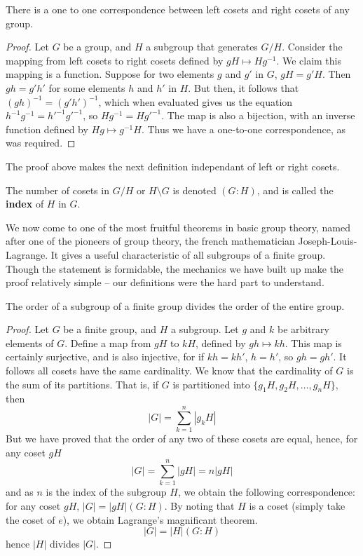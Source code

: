 \begin{lemma} There is a one to one correspondence between left cosets and right cosets of any group. \end{lemma}
\begin{proof}
Let $G$ be a group, and $H$ a subgroup that generates $G/H$. Consider the mapping from left cosets to right cosets defined by $gH \mapsto Hg^{-1}$. We claim this mapping is a function. Suppose for two elements $g$ and $g'$ in $G$, $gH = g'H$. Then $gh = g'h'$ for some elements $h$ and $h'$ in $H$. But then, it follows that $(gh)^{-1} = (g'h')^{-1}$, which when evaluated gives us the equation $h^{-1}g^{-1} = h'^{-1}g'^{-1}$, so $Hg^{-1} = Hg'^{-1}$. The map is also a bijection, with an inverse function defined by $Hg \mapsto g^{-1}H$. Thus we have a one-to-one correspondence, as was required.
\end{proof}

The proof above makes the next definition independant of left or right cosets.

\begin{definition}
    The number of cosets in $G/H$ or $H \setminus G$ is denoted $(G:H)$, and is called the {\bf index}  of $H$ in $G$.
\end{definition}

We now come to one of the most fruitful theorems in basic group theory, named after one of the pioneers of group theory, the french mathematician Joseph-Louis-Lagrange. It gives a useful characteristic of all subgroups of a finite group. Though the statement is formidable, the mechanics we have built up make the proof relatively simple -- our definitions were the hard part to understand.

\begin{theorem} 
    The order of a subgroup of a finite group divides the order of the entire group.
\end{theorem}
\begin{proof}
Let $G$ be a finite group, and $H$ a subgroup. Let $g$ and $k$ be arbitrary elements of $G$. Define a map from $gH$ to $kH$, defined by $gh \mapsto kh$. This map is certainly surjective, and is also injective, for if $kh = kh'$, $h = h'$, so $gh = gh'$. It follows all cosets have the same cardinality. We know that the cardinality of $G$ is the sum of its partitions. That is, if $G$ is partitioned into $\{ g_1H, g_2H, \dots, g_nH \}$, then
%
\[ |G| = \sum_{k = 1}^n |g_kH| \]
%
But we have proved that the order of any two of these cosets are equal, hence, for any coset $gH$
%
\[ |G| = \sum_{k = 1}^n |gH| = n|gH| \]
%
and as $n$ is the index of the subgroup $H$, we obtain the following correspondence: for any coset $gH$, $|G| = |gH|(G:H)$. By noting that $H$ is a coset (simply take the coset of $e$), we obtain Lagrange's magnificant theorem.
%
\[ |G| = |H|(G:H) \]
%
hence $|H|$ divides $|G|$.
\end{proof}

